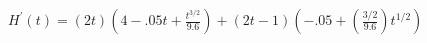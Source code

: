 $ \displaystyle  H^{\prime}(t) = (2t)(4 - .05t + \frac{t^{3/2}}{9.6}) + (2t - 1)(- .05 + \left(\frac{3/2}{9.6}\right)t^{1/2})  $